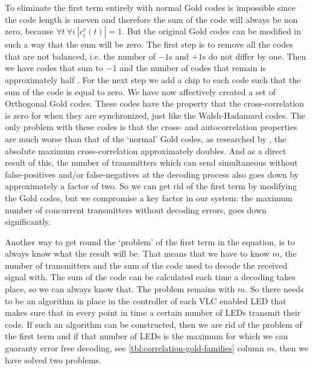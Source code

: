 		To eliminate the first term entirely with normal Gold codes is impossible since the code length is uneven and therefore the sum of the code will always be non zero, because $\forall t \ \forall i \  | c^r_i(t) | = 1$.
		But the original Gold codes can be modified in such a way that the sum will be zero. 
		The first step is to remove all the codes that are not balanced, i.e. the number of $-1$s and $+1$s do not differ by one.
		Then we have codes that sum to $-1$ and the number of codes that remain is approximately half \cite{holmes2007spread}.
		For the next step we add a chip to each code such that the sum of the code is equal to zero.
		We have now affectively created a set of Orthogonal Gold codes.
		These codes have the property that the cross-correlation is zero for when they are synchronized, just like the Walsh-Hadamard codes.
		The only problem with these codes is that the cross- and autocorrelation properties are much worse than that of the `normal' Gold codes, as researched by \cite{5422934}, the absolute maximum cross-correlation approximately doubles.
		And as a direct result of this, the number of transmitters which can send simultaneous without false-positives and/or false-negatives at the decoding process also goes down by approximately a factor of two.
		So we can get rid of the first term by modifying the Gold codes, but we compromise a key factor in our system: the maximum number of concurrent transmitters without decoding errors, goes down significantly.

		Another way to get round the `problem' of the first term in the equation, is to always know what the result will be.
		That means that we have to know $m$, the number of transmitters and the sum of the code used to decode the received signal with.
		The sum of the code can be calculated each time a decoding takes place, so we can always know that.
		The problem remains with $m$. 
		So there needs to be an algorithm in place in the controller of each VLC enabled LED that makes sure that in every point in time a certain number of LEDs transmit their code.
		If such an algorithm can be constructed, then we are rid of the problem of the first term and if that number of LEDs is the maximum for which we can guaranty error free decoding, see \autoref{tbl:correlation-gold-families} column $m$, then we have solved two problems.


